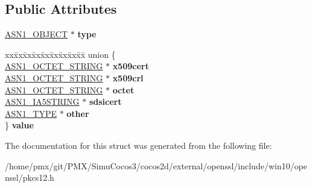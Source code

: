\subsection*{Public Attributes}
\begin{DoxyCompactItemize}
\item 
\mbox{\label{structpkcs12__bag__st_a6f70869478b661dce62ea8f340d15086}} 
\hyperlink{structasn1__object__st}{A\+S\+N1\+\_\+\+O\+B\+J\+E\+CT} $\ast$ {\bfseries type}
\item 
\mbox{\label{structpkcs12__bag__st_ac37e222cb102b45ab95c0bc334efc11e}} 
\begin{tabbing}
xx\=xx\=xx\=xx\=xx\=xx\=xx\=xx\=xx\=\kill
union \{\\
\>\hyperlink{structasn1__string__st}{ASN1\_OCTET\_STRING} $\ast$ {\bfseries x509cert}\\
\>\hyperlink{structasn1__string__st}{ASN1\_OCTET\_STRING} $\ast$ {\bfseries x509crl}\\
\>\hyperlink{structasn1__string__st}{ASN1\_OCTET\_STRING} $\ast$ {\bfseries octet}\\
\>\hyperlink{structasn1__string__st}{ASN1\_IA5STRING} $\ast$ {\bfseries sdsicert}\\
\>\hyperlink{structasn1__type__st}{ASN1\_TYPE} $\ast$ {\bfseries other}\\
\} {\bfseries value}\\

\end{tabbing}\end{DoxyCompactItemize}


The documentation for this struct was generated from the following file\+:\begin{DoxyCompactItemize}
\item 
/home/pmx/git/\+P\+M\+X/\+Simu\+Cocos3/cocos2d/external/openssl/include/win10/openssl/pkcs12.\+h\end{DoxyCompactItemize}
